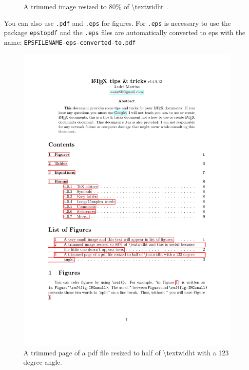 \documentclass[a4paper,12pt]{article}
\begin{document}
\begin{figure}[H]
\centering
{}
\caption[A trimmed image resized to 80\% of {\textbackslash}textwidht and this is useful because the little one doesn't appear here.]{A trimmed image resized to 80\% of {\textbackslash}textwidht~\footnotemark.}
\label{fig:IMGtrimmed}
\end{figure}




You can also use \verb|.pdf| and \verb|.eps| for figures. For \verb|.eps| is necessary to use the package \verb|epstopdf| and the \verb|.eps| files are automatically converted to eps with the name: \verb|EPSFILENAME-eps-converted-to.pdf|

\begin{figure}[H]
\centering
	\includegraphics[page=2,width=.5\textwidth,angle=123,clip=true]{images/tipsetricks}
\caption{A trimmed page of a pdf file resized to half of {\textbackslash}textwidht with a 123 degree angle.}
\label{fig:pdf}
\end{figure}

\end{document}
